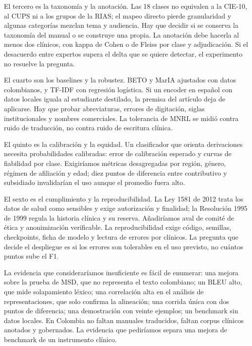 El tercero es la taxonomía y la anotación. Las 18 clases no equivalen a la CIE-10, al CUPS ni a los grupos de la RIAS; el mapeo directo pierde granularidad y algunas categorías mezclan tema y audiencia. Hay que decidir si se conserva la taxonomía del manual o se construye una propia. La anotación debe hacerla al menos dos clínicos, con kappa de Cohen o de Fleiss por clase y adjudicación. Si el desacuerdo entre expertos supera el delta que se quiere detectar, el experimento no resuelve la pregunta.

El cuarto son los baselines y la robustez. BETO \cite{canete2020} y MarIA \cite{gutierrez2022} ajustados con datos colombianos, y TF-IDF con regresión logística. Si un encoder en español con datos locales iguala al estudiante destilado, la premisa del artículo deja de aplicarse. Hay que probar abreviaturas, errores de digitación, siglas institucionales y nombres comerciales. La tolerancia de MNRL se midió contra ruido de traducción, no contra ruido de escritura clínica.

El quinto es la calibración y la equidad. Un clasificador que orienta derivaciones necesita probabilidades calibradas: error de calibración esperado y curvas de fiabilidad por clase. Exigiríamos métricas desagregadas por región, género, régimen de afiliación y edad; diez puntos de diferencia entre contributivo y subsidiado invalidarían el uso aunque el promedio fuera alto.

El sexto es el cumplimiento y la reproducibilidad. La Ley 1581 de 2012 trata los datos de salud como sensibles y exige autorización y finalidad; la Resolución 1995 de 1999 regula la historia clínica y su reserva. Añadiríamos aval de comité de ética y anonimización verificable. La reproducibilidad exige código, semillas, checkpoints, ficha de modelo y lectura de errores por clínicos. La pregunta que decide el despliegue es si los errores son tolerables en el uso previsto, no cuántos puntos sube el F1.

La evidencia que consideraríamos insuficiente es fácil de enumerar: una mejora sobre la prueba de MSD, que no representa el texto colombiano; un BLEU alto, que mide solapamiento léxico; una correlación alta en el análisis de representaciones, que solo confirma la alineación; una corrida única con dos puntos de diferencia; una demostración con veinte ejemplos; un benchmark sin datos locales. En Colombia no faltan manuales traducidos, faltan corpus clínicos anotados y gobernados. La evidencia que pediríamos separa una mejora de benchmark de un instrumento clínico.
